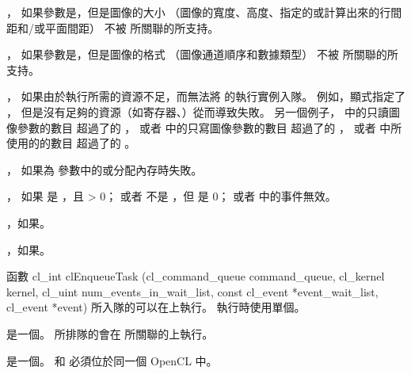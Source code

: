 \item {}，
如果參數是，但是圖像的大小
（圖像的寬度、高度、指定的或計算出來的行間距和/或平面間距）
不被  所關聯的所支持。

\item {}，
如果參數是，但是圖像的格式
（圖像通道順序和數據類型）
不被  所關聯的所支持。

\item {}，
如果由於執行所需的資源不足，而無法將  的執行實例入隊。
例如，顯式指定了 ，
但是沒有足夠的資源（如寄存器、）從而導致失敗。
另一個例子， 中的只讀圖像參數的數目
超過了的 ，
或者 中的只寫圖像參數的數目
超過了的 ，
或者 中所使用的的數目
超過了的 。

\item {}，
如果為  參數中的或分配內存時失敗。

\item {}，
  如果  是 ，且  > 0；
  或者  不是 ，但  是 0；
  或者  中的事件無效。

\item {}，如果\scdevfailres。

\item {}，如果\schostfailres。
\stopigBase

函數
\startclc
cl_int
clEnqueueTask (cl_command_queue command_queue,
		cl_kernel kernel,
		cl_uint num_events_in_wait_list,
		const cl_event *event_wait_list,
		cl_event *event)
\stopclc
所入隊的可以在上執行。
執行時使用單個。

 是一個。
所排隊的會在  所關聯的上執行。

 是一個。
  和  必須位於同一個 OpenCL 中。

